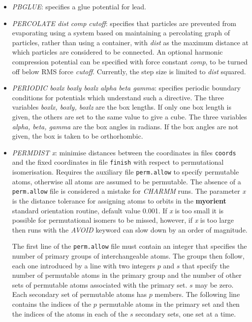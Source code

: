 \documentclass[12pt,a4paper,dvips]{article}
\begin{document}
\begin{itemize}
\item {\it PBGLUE\/}: specifies a glue potential for lead.

\item {\it PERCOLATE dist comp cutoff\/}: specifies that particles are prevented from evaporating using a system based on maintaining a percolating graph of particles, rather than using a container, with {\it dist\/} as the maximum distance at which particles are considered to be connected. An optional harmonic compression potential can be specified with force constant {\it comp\/}, to be turned off below RMS force {\it cutoff\/}. Currently, the step size is limited to {\it dist\/} squared.

\item {\it PERIODIC boxlx boxly boxlz alpha beta gamma\/}: specifies periodic boundary conditions for
potentials which understand such a directive. The three variables {\it boxlx, boxly, boxlz\/} are the
box lengths. If only one box length is given, the others are set to the same value to give a cube.
The three variables {\it alpha, beta, gamma\/} are the box angles in radians. If the box angles are
not given, the box is taken to be orthorhombic. 

\item {\it PERMDIST x\/}: minimise distances between 
the coordinates in files {\tt coords} and the
fixed coordinates in file {\tt finish} with respect to permutational isomerisation.
Requires the auxiliary file {\tt perm.allow} to specify permutable atoms, otherwise
all atoms are assumed to be permutable. The absence of a {\tt perm.allow}
file is considered a mistake for {\it CHARMM\/} runs.
The parameter {\it x} is the distance tolerance for assigning atoms to orbits
in the {\bf myorient} standard orientation routine, default value 0.001. 
If {\it x} is too small it is possible for permutational isomers to be missed,
however, if {\it x\/} is too large then runs with the {\it AVOID\/} keyword can
slow down by an order of magnitude.

The first line of the {\tt perm.allow} file must contain an integer
that specifies the number of primary groups of interchangeable atoms.
The groups then follow, each one introduced by a line with two integers $p$ and $s$
that specify the number of permutable atoms in the primary group and the number of other sets
of permutable atoms associated with the primary set.
$s$ may be zero.
Each secondary set of permutable atoms has $p$ members.
The following line contains the indices of the $p$ permutable atoms 
in the primary set and then
the indices of the atoms in each of the $s$ secondary sets, one set at 
a time.


\end{itemize}
\end{document}
